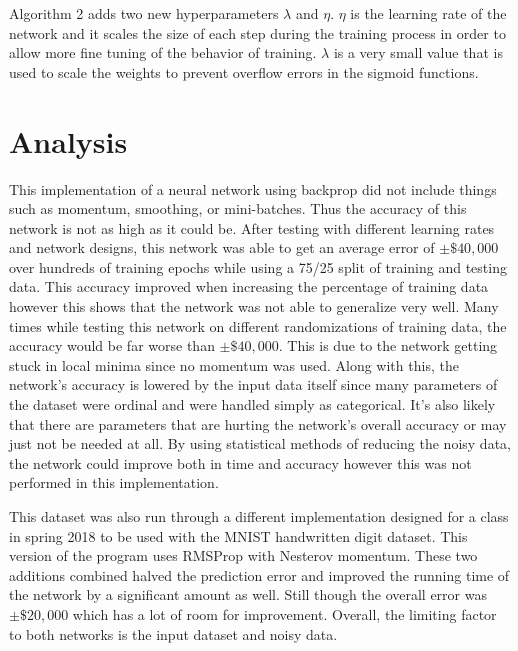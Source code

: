 \documentclass{article}
\theoremstyle{plain} %
\theoremstyle{definition} %
\theoremstyle{plain} %
\begin{document}
\vspace{1em}
\noindent Algorithm 2 adds two new hyperparameters $\lambda$ and $\eta$. $\eta$ is the learning rate of the network and it scales the size of each step during the training process in order to allow more fine tuning of the behavior of training. $\lambda$ is a very small value that is used to scale the weights to prevent overflow errors in the sigmoid functions.

\section*{Analysis}
This implementation of a neural network using backprop did not include things such as momentum, smoothing, or mini-batches. Thus the accuracy of this network is not as high as it could be. After testing with different learning rates and network designs, this network was able to get an average error of $\pm \$40,000$ over hundreds of training epochs while using a 75/25 split of training and testing data. This accuracy improved when increasing the percentage of training data however this shows that the network was not able to generalize very well. Many times while testing this network on different randomizations of training data, the accuracy would be far worse than $\pm \$40,000$. This is due to the network getting stuck in local minima since no momentum was used. Along with this, the network's accuracy is lowered by the input data itself since many parameters of the dataset were ordinal and were handled simply as categorical. It's also likely that there are parameters that are hurting the network's overall accuracy or may just not be needed at all. By using statistical methods of reducing the noisy data, the network could improve both in time and accuracy however this was not performed in this implementation.

This dataset was also run through a different implementation designed for a class in spring 2018 to be used with the MNIST handwritten digit dataset. This version of the program uses RMSProp with Nesterov momentum. These two additions combined halved the prediction error and improved the running time of the network by a significant amount as well. Still though the overall error was $\pm \$20,000$ which has a lot of room for improvement. Overall, the limiting factor to both networks is the input dataset and noisy data.
\end{document}
